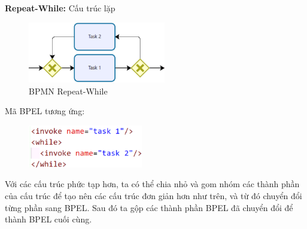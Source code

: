 \textbf{Repeat-While:} Cấu trúc lặp
\begin{figure}[!htp]
    \begin{center}
        \includegraphics[width=6cm]{img/Theory/tranfer/repeat-while.png}
    \end{center}
    \caption{BPMN Repeat-While}
\end{figure}
\newpage
\par Mã BPEL tương ứng:
\begin{figure}[!htp]
    \begin{center}
        \includegraphics[width=5cm]{img/Theory/tranfer/repeat-whileCode.png}
    \end{center}
\end{figure}

\par Với các cấu trúc phức tạp hơn, ta có thể chia nhỏ và gom nhóm các thành phần của cấu trúc để tạo nên các cấu trúc  đơn giản hơn như trên, và từ đó chuyển đổi từng phần sang BPEL. Sau đó ta gộp các thành phần BPEL đã chuyển đổi để thành BPEL cuối cùng.



